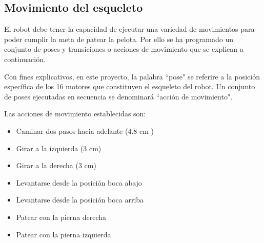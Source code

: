 

\subsection{Movimiento del esqueleto}\label{esqueleto}

El robot debe tener la capacidad de ejecutar una variedad de movimientos para poder cumplir la meta de patear la pelota. Por ello se ha programado un conjunto de poses y transiciones o acciones de movimiento que se explican a continuación.

Con fines explicativos, en este proyecto, la palabra ``pose" se referire a la posición específica de los 16 motores que constituyen el esqueleto del robot. Un conjunto de poses ejecutadas en secuencia se denominará ``acción de movimiento".

Las acciones de movimiento establecidas son:

\begin{itemize}
 \item {Caminar dos pasos hacia adelante (4.8 cm ) }
 \item {Girar a la izquierda (3 cm)}
 \item {Girar a la derecha (3 cm)}
 \item {Levantarse desde la posición boca abajo}
 \item {Levantarse desde la posición boca arriba}
 \item {Patear con la pierna derecha }
 \item {Patear con la pierna izquierda}
 
\end{itemize}


